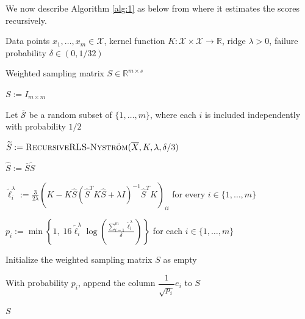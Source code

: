 We now describe Algorithm \ref{alg:1} as below from \citet{musco2017recursive} where it estimates the scores recursively.

\begin{algorithm}[ht!]
\caption{RecursiveRLS-Nystr\"om}
\label{alg:1}
\begin{algorithmic}[1]

\Require Data points $x_1,\ldots,x_m\in\mathcal{X}$, kernel function $K:\mathcal{X}\times\mathcal{X}\rightarrow\mathbb{R}$, ridge $\lambda>0$, failure probability $\delta\in(0,1/32)$

\Ensure Weighted sampling matrix $S\in\mathbb{R}^{m\times s}$

    \State \Return $S:= I_{m\times m}$
\EndIf

\State Let $\overline{\mathcal{S}}$ be a random subset of $\{1,\ldots,m\}$, where each $i$ is included independently with probability $1/2$

\Statex {}

\Statex {}

\State $\widetilde{S}:=\Call{RecursiveRLS-Nystr\"om}{\overline{X},K,\lambda,\delta/3}$

\State $\widehat{S}:=\overline{S}\widetilde{S}$

\State $\displaystyle \widetilde{\ell}_i^{\lambda}:=\frac{3}{2\lambda}\left(K-K\widehat{S}\left(\widehat{S}^{T}K\widehat{S}+\lambda I\right)^{-1}\widehat{S}^{T}K\right)_{ii}$ for every $i\in\{1,\ldots,m\}$

\Statex {}

\State $\displaystyle p_i:=\min\left\{1,\;16\widetilde{\ell}_i^{\lambda}\log\left(\frac{\sum_{i=1}^{m}\widetilde{\ell}_i^{\lambda}}{\delta}\right)\right\}$ for each $i\in\{1,\ldots,m\}$

\State Initialize the weighted sampling matrix $S$ as empty

    \State With probability $p_i$, append the column $\dfrac{1}{\sqrt{p_i}}e_i$ to $S$
\EndFor

\State \Return $S$

\end{algorithmic}
\end{algorithm}

